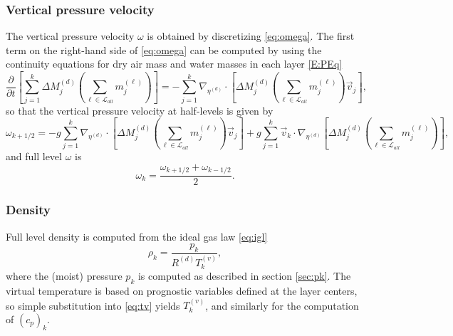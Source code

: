 \documentclass{agujournal}
\begin{document}
{\subsubsection{Vertical pressure velocity}
The vertical pressure velocity $\omega$ is obtained by discretizing \eqref{eq:omega}. The first term on the right-hand side of \eqref{eq:omega} can be computed by using the continuity equations for dry air mass and water masses in each layer \eqref{E:PEq}
\begin{equation}
\frac{\partial }{\partial t}\left[\sum_{j=1}^k \Delta M^{(d)}_j \left( \sum_{\ell \in \mathcal{L}_{all}} m_j^{(\ell)}\right)\right] = -\sum_{j=1}^k \nabla_{\eta^{(d)}}\cdot \left[ \Delta M^{(d)}_j\left(\sum_{\ell \in \mathcal{L}_{all}} m_j^{(\ell)} \right)\vec{v}_j\right],
\end{equation}
so that the vertical pressure velocity at half-levels is given by
\begin{equation}
\omega_{k+1/2}=-g\sum_{j=1}^k \nabla_{\eta^{(d)}}\cdot \left[ \Delta M^{(d)}_j\left(\sum_{\ell \in \mathcal{L}_{all}} m_j^{(\ell)} \right)\vec{v}_j \right]+g\sum_{j=1}^k \vec{v}_k \cdot \nabla_{\eta^{(d)}}\left[ \Delta M^{(d)}_j\left( \sum_{\ell \in \mathcal{L}_{all}} m_j^{(\ell)}\right)\right],
\end{equation}
and full level $\omega$ is
\begin{equation}
\omega_k=\frac{\omega_{k+1/2}+\omega_{k-1/2}}{2}.
\end{equation}
\subsubsection{Density}
Full level density is computed from the ideal gas law \eqref{eq:igl}
\begin{equation}
\rho_k=\frac{p_k}{R^{(d)} T_k^{(v)}},
\end{equation}
where the (moist) pressure $p_k$ is computed as described in section \ref{sec:pk}. The virtual temperature is based on prognostic variables defined at the layer centers, so simple substitution into \eqref{eq:tv} yields $T_k^{(v)}$, and similarly for the computation of $\left( c_p\right)_k$.
}
\end{document}
